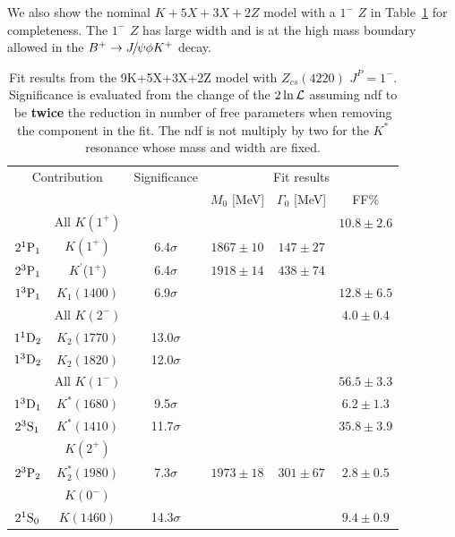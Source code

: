 We also show the nominal $K+5X+3X+2Z$ model with a $1^-$ $Z$ in Table~\ref{tab:fit1m} for completeness. 
The $1^-$ $Z$ has large width and is at the high mass boundary allowed in the ${{{B}^+}}\rightarrow{\ensuremath{{J\mskip -3mu/\mskip -2mu\psi}}} \phi {\ensuremath{{K}^+}}$ decay.
\begin{table}[tbph]
\begin{center}
\caption{Fit results from  the 9K+5X+3X+2Z model with $Z_{cs}(4220)$ $J^P=1^-$. 
Significance is evaluated from the change of the $2\ln\mathcal{L}$ assuming ndf to be {\bf twice} the reduction in number of free parameters when removing the component in the fit. 
The ndf is not multiply by two for the $K^*$ resonance whose mass and width are fixed.}\label{tab:fit1m}
\begin{tabular}{cccccc}
\hline
\multicolumn{2}{c}{Contribution} &Significance & \multicolumn{3}{c}{Fit results}  \\
                  &                           &                 & $M_0$ [MeV]   & $\Gamma_0$ [MeV]      & FF\%          \\
\hline \hline
   &     All $K(1^+)$    &        &    &   &  $10.8\pm2.6$          \\
$2{}^{1}{\rm P}_{1}$   &  $K(1^+)$             & 6.4$\sigma$  &  $1867\pm 10 $  &  $147\pm27$  &       \\
$2{}^{3}{\rm P}_{1}$   &  $K^{\prime}$($1^+$)  & 6.4$\sigma$  &  $1918\pm 14 $  &  $438\pm74$  &       \\
$1{}^{3}{\rm P}_{1}$   &  $K_1(1400)$          & 6.9$\sigma$  &  &     &   $12.8\pm6.5$    \\
\hline

&     All $K(2^-)$    &        &        & &  $4.0\pm0.4$           \\
$1{}^{1}{\rm D}_{2}$   &  $K_2 (1770)$   & 13.0$\sigma$       &    &    &     \\
$1{}^{3}{\rm D}_{2}$   &  $K_2(1820)$    & 12.0$\sigma$       &    &    &     \\       

\hline
& All $K(1^-)$        & & & & $56.5\pm3.3$ \\
$1{}^{3}{\rm D}_{1}$   &  $K^*(1680)$    & 9.5$\sigma$  &   &    &  $6.2\pm1.3$    \\  
$2{}^{3}{\rm S}_{1}$   &  $K^*(1410)$    & 11.7$\sigma$   &   &    &  $35.8\pm3.9$   \\
\hline

& $K(2^+)$\\
$2{}^{3}{\rm P}_{2}$   &  $K^*_2(1980)$  & 7.3$\sigma$   &  $1973\pm18 $   &   $301\pm67$   & $2.8\pm0.5$        \\  
\hline 
& $K(0^-)$\\
$2{}^{1}{\rm S}_{0}$   &  $K(1460)$      & 14.3$\sigma$       &    &      & $9.4\pm0.9$    \\  


\end{tabular}
\end{center}
\end{table}
